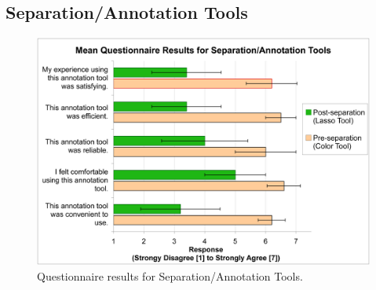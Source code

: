 \documentclass{elsart}
\begin{document}

 \subsection{Separation/Annotation Tools}

\begin{figure}[tb]
  \centering
  \includegraphics[width=.9\linewidth]{QuestionnaireResultsSepAnnoTools.png}
  \caption{\label{fig:qResultsSepTools}
           Questionnaire results for Separation/Annotation Tools. }
\end{figure}


\end{document}
